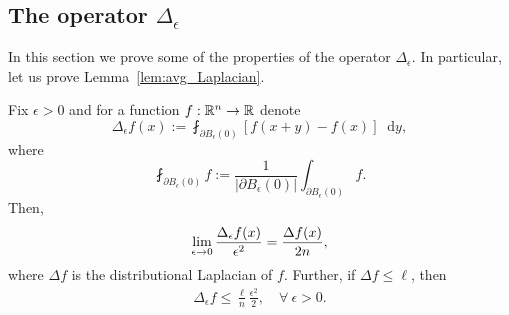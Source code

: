 \documentclass[AHL,Unicode,longabstracts]{cedram}
\newcommand{\R}{\mathbb R}
\newcommand{\dd}{n}
\newcommand*\diff{\mathop{}\!\mathrm{d}}
\newcommand{\avgint}{\fint}
\renewcommand*{\to}{\mathchoice{\longrightarrow}{\rightarrow}{\rightarrow}{\rightarrow}}
\let\oldforall\forall
\renewcommand*{\forall}{\mathrel{\oldforall}}
\begin{document}
\subsection{The operator \texorpdfstring{$\Delta_{\epsilon}$}{Delta\_ epsilon}}\label{subsec:appendix_Delta_eps}
In this section we prove some of the properties of the operator $\Delta_{\epsilon}$. In particular, let us prove Lemma~\ref{lem:avg_Laplacian}.
\begin{lemm}\label{lem:avg_Laplacian_appendix}
Fix $\epsilon> 0$ and for a function $f:\R^{\dd}\to\R$ denote
\[
\Delta_{\epsilon}f(x):=\avgint_{\partial B_{\epsilon}(0)}[f(x+y)-f(x)]\diff y,
\]
where
\[
\avgint_{\partial B_{\epsilon}(0)}f:=\frac{1}{|\partial B_{\epsilon}(0)|}\int_{\partial B_{\epsilon}(0)}f.
\]
Then,
\begin{align}\label{eq:Delta_eps_lim_appendix}
\lim_{\epsilon\to 0}\frac{\Delta_{\epsilon}f(x)}{\epsilon^{2}}=\frac{\Delta f(x)}{2\dd},
\end{align}
where $\Delta f$ is the distributional Laplacian of $f$. Further, if $\Delta f\le \ell$, then
\begin{align}\label{eq:Delta_eps_bound_appendix}
\Delta_{\epsilon}f\le \frac{\ell}{\dd}\frac{\epsilon^2}{2},\quad \forall~\epsilon>0.
\end{align}
\end{lemm}
\end{document}
